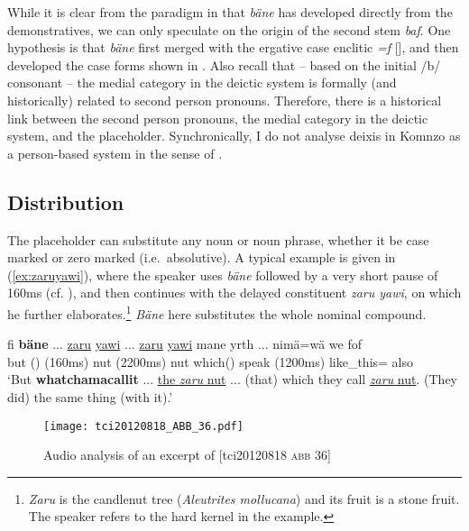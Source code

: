\documentclass[output=paper,colorlinks,citecolor=brown]{langscibook}
\begin{document}
While it is clear from the paradigm in  that \textit{bäne} has developed directly from the demonstratives, we can only speculate on the origin of the second stem \textit{baf}. One hypothesis is that \textit{bäne} first merged with the ergative case enclitic \textit{=f} [], and then developed the case forms shown in . Also recall that -- based on the initial /b/ consonant -- the medial category in the deictic system is formally (and historically) related to second person pronouns. Therefore, there is a historical link between the second person pronouns, the medial category in the deictic system, and the placeholder. Synchronically, I do not analyse deixis in Komnzo as a person-based system in the sense of \textcite{Keenan:1985fm}.

\subsection{Distribution}\label{sec:doehler:banedist}

The placeholder can substitute any noun or noun phrase, whether it be case marked or zero marked (i.e.\ absolutive). A typical example is given in (\ref{ex:zaruyawi}), where the speaker uses \textit{bäne} followed by a very short pause of 160ms (cf. ), and then continues with the delayed constituent \textit{zaru yawi}, on which he further elaborates.\footnote{\textit{Zaru} is the candlenut tree (\textit{Aleutrites mollucana}) and its fruit is a stone fruit. The speaker refers to the hard kernel in the example.} \textit{Bäne} here substitutes the whole nominal compound.

\ea \label{ex:zaruyawi}
    \gll fi \textbf{bäne} ... \uline{zaru} \uline{yawi} ... \uline{zaru} \uline{yawi} mane yrth ... nimä=wä we fof\\
    but () (160ms)  nut (2200ms)  nut which() speak (1200ms) like\_this= also \\
    \glt `But \textbf{whatchamacallit} ... \uline{the \textit{zaru} nut} ... (that) which they call \uline{\textit{zaru} nut}. (They did) the same thing (with it).' 
\z

\begin{figure}
    \texttt{[image: tci20120818\_ABB\_36.pdf]}
    \caption{Audio analysis of an excerpt of [tci20120818 \textsc{abb} 36]}
    \label{fig:doehler:zaruyawi}
\end{figure}
\end{document}
